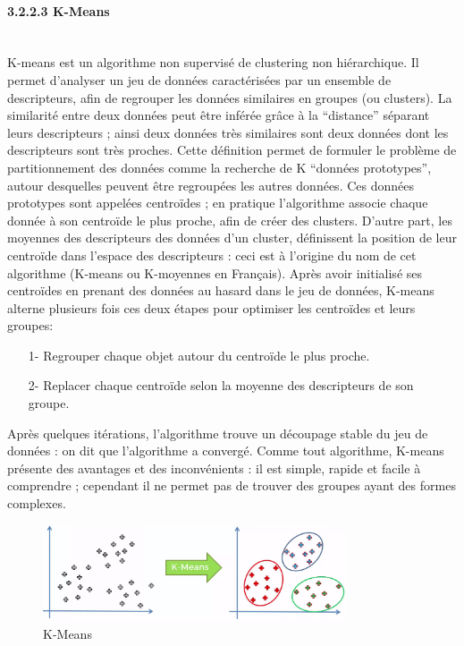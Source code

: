 \paragraph{{\large 3.2.2.3 K-Means}\\\\}
K-means est un algorithme non supervisé de clustering non hiérarchique. Il permet d’analyser un jeu de données caractérisées par un ensemble de descripteurs, afin de regrouper les données similaires en groupes (ou clusters). La similarité entre deux données peut être inférée grâce à la “distance” séparant leurs descripteurs ; ainsi deux données très similaires sont deux données dont les descripteurs sont très proches. Cette définition permet de formuler le problème de partitionnement des données comme la recherche de K “données prototypes”, autour desquelles peuvent être regroupées les autres données. Ces données prototypes sont appelées centroïdes ; en pratique l’algorithme associe chaque donnée à son centroïde le plus proche, afin de créer des clusters. D’autre part, les moyennes des descripteurs des données d’un cluster, définissent la position de leur centroïde dans l’espace des descripteurs : ceci est à l’origine du nom de cet algorithme (K-means ou K-moyennes en Français). Après avoir initialisé ses centroïdes en prenant des données au hasard dans le jeu de données, K-means alterne plusieurs fois ces deux étapes pour optimiser les centroïdes et leurs groupes:\\
\begin{itemize}
\item[1-]Regrouper chaque objet autour du centroïde le plus proche.
\item[2-]Replacer chaque centroïde selon la moyenne des descripteurs de son groupe.\\
\end{itemize}

Après quelques itérations, l’algorithme trouve un découpage stable du jeu de données : on dit que l’algorithme a convergé. Comme tout algorithme, K-means présente des avantages et des inconvénients : il est simple, rapide et facile à comprendre ; cependant il ne permet pas de trouver des groupes ayant des formes complexes.

\begin{figure}[h]
\centering
\includegraphics[width=0.8\textwidth]{Figures/K-means}
\decoRule
\caption{K-Means}
\label{fig:K-means}
\end{figure}

